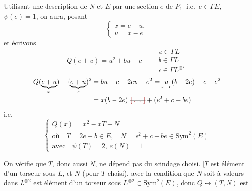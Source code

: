 \documentclass[11pt,a4paper]{article}
\begin{document}


Utilisant une description de $N$ et $E$ par une section $e$ de $P_{1}$, i.e.\ $e \in \Gamma E$, $\psi(e) = 1$, on aura, posant
\[
  \left\{\begin{array}{l} x = e + u, \\ u = x - e \end{array}\right.
\]
 et écrivons
\[
  Q(e + u) = u^{2} + bu + c
  \qquad
  \begin{array}{l} u \in \Gamma L\\ b \in \Gamma L\\ c \in \Gamma L^{\otimes 2} \end{array}
\]
\begin{align*}
  Q(\underbrace{e + u}_{x}) - (\underbrace{e + u}_{x})^{2}
  &= bu + c - 2eu - e^{2} = \underset{x - e}{u}(b - 2e) + c - e^{2}\\
  &= x(b - 2e) \ \text{\struck{\ill{}}} + (e^{2} + c - be)
\end{align*}
i.e.
\[
  \left\{\begin{array}{l}
    Q(x) = x^{2} - xT + N\\[2pt]
    \text{où}\quad \boxed{T = 2e - b \in E, \quad N = e^{2} + c - be \in \mathrm{Sym}^{2}(E)}\\[2pt]
    \text{avec}\quad \boxed{\psi(T) = 2, \ \varepsilon(N) = 1}
  \end{array}\right.
\]

\struck{\ill{}} On vérifie que $T$, donc aussi $N$, ne dépend pas du scindage choisi. [$T$ est élément d'un torseur  sous $L$,  et $N$ (pour $T$ choisi), avec la condition que $N$ soit à valeurs dans $L^{\otimes 2}$  est élément d'un torseur sous $L^{\otimes 2} \subset \mathrm{Sym}^{2}(E)$, donc  \add{\ill{}} $Q \leftrightarrow (T, N)$ est 
\end{document}
